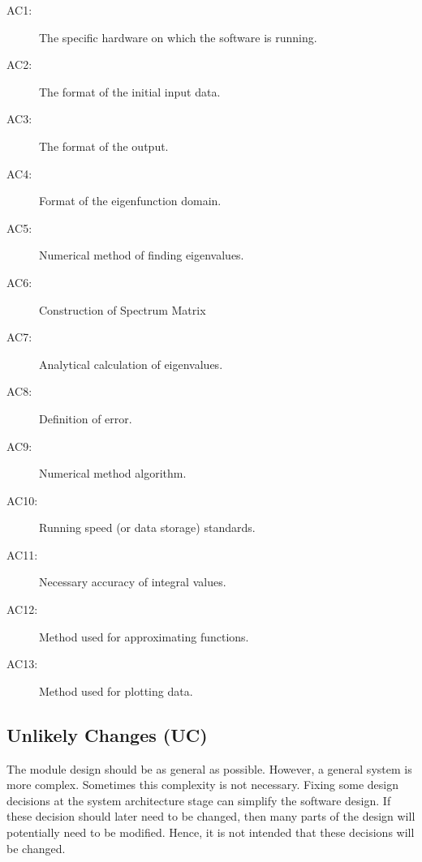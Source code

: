 \documentclass[12pt, titlepage]{article}
\begin{document}
	\begin{description}
		\item[AC1:] The specific hardware on which the software is running.\\
		\item[AC2:] The format of the initial input data.\\
		\item[AC3:] The format of the output.\\
		\item[AC4:] Format of the eigenfunction domain. \\
		\item[AC5:] Numerical method of finding eigenvalues. \\ 
		\item[AC6:] Construction of Spectrum Matrix \\ 
		\item[AC7:] Analytical calculation of eigenvalues. \\
		\item[AC8:] Definition of error. \\
		\item[AC9:] Numerical method algorithm. \\ 
		\item[AC10:] Running speed (or data storage) standards. \\ 
		\item[AC11:] Necessary accuracy of integral values. \\ 
		\item[AC12:] Method used for approximating functions. \\
		\item[AC13:] Method used for plotting data. \\
	\end{description}
	
	\subsection{Unlikely Changes (UC)} \label{SecUchange}
	
	The module design should be as general as possible. However, a general 
	system is
	more complex. Sometimes this complexity is not necessary. Fixing some design
	decisions at the system architecture stage can simplify the software 
	design. If
	these decision should later need to be changed, then many parts of the 
	design
	will potentially need to be modified. Hence, it is not intended that these
	decisions will be changed.
	
\end{document}
